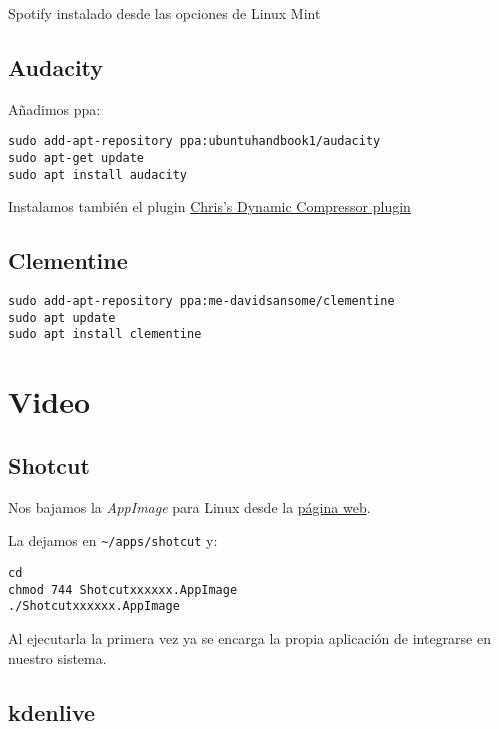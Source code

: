 \documentclass[
  12pt,
  spanish,
]{article}
\begin{document}
Spotify instalado desde las opciones de Linux Mint

\hypertarget{audacity}{%
\subsection{Audacity}\label{audacity}}

Añadimos ppa:

\begin{verbatim}
sudo add-apt-repository ppa:ubuntuhandbook1/audacity
sudo apt-get update
sudo apt install audacity
\end{verbatim}

Instalamos también el plugin
\href{https://theaudacitytopodcast.com/chriss-dynamic-compressor-plugin-for-audacity/}{Chris's
Dynamic Compressor plugin}

\hypertarget{clementine}{%
\subsection{Clementine}\label{clementine}}

\begin{verbatim}
sudo add-apt-repository ppa:me-davidsansome/clementine
sudo apt update
sudo apt install clementine
\end{verbatim}

\hypertarget{video}{%
\section{Video}\label{video}}

\hypertarget{shotcut}{%
\subsection{Shotcut}\label{shotcut}}

Nos bajamos la \emph{AppImage} para Linux desde la
\href{https://www.shotcut.org/}{página web}.

La dejamos en \texttt{\textasciitilde{}/apps/shotcut} y:

\begin{verbatim}
cd
chmod 744 Shotcutxxxxxx.AppImage
./Shotcutxxxxxx.AppImage
\end{verbatim}

Al ejecutarla la primera vez ya se encarga la propia aplicación de
integrarse en nuestro sistema.

\hypertarget{kdenlive}{%
\subsection{kdenlive}\label{kdenlive}}
\end{document}
